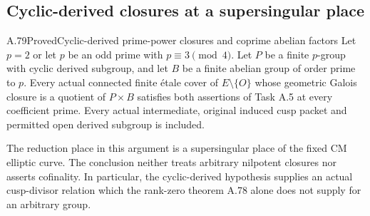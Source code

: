 \subsection{Cyclic-derived closures at a supersingular place}

\begin{statement}{A.79}{Proved}{Cyclic-derived prime-power closures and coprime abelian factors}
Let \(p=2\) or let \(p\) be an odd prime with
\(p\equiv3\pmod4\). Let \(P\) be a finite
\(p\)-group with cyclic derived subgroup, and let
\(B\) be a finite abelian group of order prime to \(p\).
Every actual connected finite \'etale cover of
\(E\setminus\{O\}\) whose geometric Galois closure
is a quotient of \(P\times B\) satisfies both assertions
of Task A.5 at every coefficient prime. Every actual
intermediate, original induced cusp packet and permitted
open derived subgroup is included.

The reduction place in this argument is a supersingular
place of the fixed CM elliptic curve. The conclusion
neither treats arbitrary nilpotent closures nor asserts
cofinality. In particular, the cyclic-derived hypothesis
supplies an actual cusp-divisor relation which the rank-zero
theorem A.78 alone does not supply for an arbitrary group.
\end{statement}

